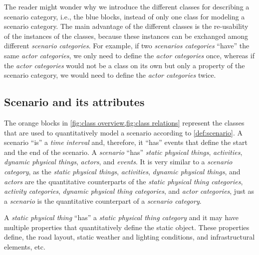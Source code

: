 The reader might wonder why we introduce the different classes for describing a scenario category, i.e., the blue blocks, instead of only one class for modeling a scenario category. 
The main advantage of the different classes is the re-usability of the instances of the classes, because these instances can be exchanged among different \textit{scenario categories}. For example, if two \textit{scenarios categories} ``have'' the same \textit{actor categories}, we only need to define the \textit{actor categories} once, whereas if the \textit{actor categories} would not be a class on its own but only a property of the scenario category, we would need to define the \textit{actor categories} twice.



\subsection{Scenario and its attributes}
\label{sec:domain scenario}

The orange blocks in \cref{fig:class overview,fig:class relations} represent the classes that are used to quantitatively model a scenario according to \cref{def:scenario}. 
\cstartb A scenario ``is'' a \textit{time interval} and, therefore, it ``has'' events that define the start and the end of the scenario. \cendb
A \textit{scenario} ``has'' \cstartc\textit{static physical things}\cendc, \textit{activities}, \cstartb \textit{dynamic physical things}, \cendb \textit{actors}, and \textit{events}. 
It is very similar to a \textit{scenario category}, as the \cstartc\textit{static physical things}\cendc, \textit{activities}, \cstartb \textit{dynamic physical things}, \cendb and \textit{actors} are the quantitative counterparts of the \cstartc\textit{static physical thing categories}\cendc, \textit{activity categories}, \cstartb \textit{dynamic physical thing categories}, \cendb and \textit{actor categories}, just as a \textit{scenario} is the quantitative counterpart of a \textit{scenario category}. 

\cstartb A \textit{static physical thing} ``has'' a \textit{static physical thing category} and it may have multiple properties that quantitatively define the static object. \cendb These properties define, the road layout, static weather and lighting conditions, and infrastructural elements, etc.

